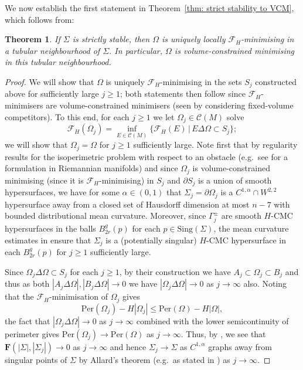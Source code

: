 \documentclass[12pt]{article}
\newtheorem{theorem}{Theorem}
\begin{document}
\medskip

We now establish the first statement in Theorem~\ref{thm: strict stability to VCM}, which follows from:

\begin{theorem}\label{thm: F_H strict stability to VCM} If $\Sigma$ is strictly stable, then $\Omega$ is uniquely locally $\mathcal{F}_H$-minimising in a tubular neighbourhood of $\Sigma$. In particular, $\Omega$ is volume-constrained minimising in this tubular neighbourhood.
\end{theorem} 

\begin{proof} 
    We will show that $\Omega$ is uniquely $\mathcal{F}_H$-minimising in the sets $S_j$ constructed above for sufficiently large $j \geq 1$; both statements then follow since $\mathcal{F}_H$-minimisers are volume-constrained minimisers (seen by considering fixed-volume competitors). To this end, for each $j \geq 1$ we let $\Omega_j \in \mathcal{C}(M)$ solve
    $$
        \mathcal{F}_H(\Omega_j) = \inf_{E \in \mathcal{C}(M)}\{\mathcal{F}_H(E) \, | \, E \Delta \Omega \subset S_j\};
    $$
    we will show that $\Omega_j = \Omega$ for $j \geq 1$ sufficiently large. Note first that by regularity results for the isoperimetric problem with respect to an obstacle (e.g.~see \cite[Theorem 1.1]{V10} for a formulation in Riemannian manifolds) and since $\Omega_j$ is volume-constrained minimising (since it is $\mathcal{F}_H$-minimising) in $S_j$ and $\partial S_j$ is a union of smooth hypersurfaces, we have for some $\alpha \in (0,1)$ that $\Sigma_j = \partial \Omega_j$ is a $C^{1,\alpha}\cap W^{2,2}$ hypersurface away from a closed set of Hausdorff dimension at most $n - 7$ with bounded distributional mean curvature. Moreover, since $\Gamma_j^{\pm}$ are smooth $H$-CMC hypersurfaces in the balls $B_{2r}^g(p)$ for each $p \in \mathrm{Sing}(\Sigma)$, the mean curvature estimates in \cite[Theorem 1.1]{V10} ensure that $\Sigma_j$ is a (potentially singular) $H$-CMC hypersurface in each $B_{2r}^g(p)$ for $j \geq 1$ sufficiently large.

    \bigskip

    Since $\Omega_j \Delta \Omega \subset S_j$ for each $j \geq 1$, by their construction we have $A_j \subset \Omega_j \subset B_j$ and thus as both $|A_j \Delta \Omega|, |B_j \Delta \Omega| \rightarrow 0$ we have $|\Omega_j \Delta \Omega| \rightarrow 0$ as $j \rightarrow \infty$ also. Noting that the $\mathcal{F}_H$-minimisation of $\Omega_j$ gives
    $$
            \mathrm{Per}(\Omega_j)-H|\Omega_j|
            \le
            \mathrm{Per}(\Omega)-H|\Omega|,
    $$
    the fact that $|\Omega_j \Delta \Omega| \rightarrow 0$ as $j \rightarrow \infty$ combined with the lower semicontinuity of perimeter gives $ \mathrm{Per}(\Omega_j)\rightarrow\mathrm{Per}(\Omega)$ as $j \rightarrow \infty$. Thus, by \cite[Proposition A.1]{DT13}, we see that $\mathbf{F}(|\Sigma|,|\Sigma_j|) \rightarrow 0$ as $j \rightarrow \infty$ and hence $\Sigma_j \rightarrow \Sigma$ as $C^{1,\alpha}$ graphs away from singular points of $\Sigma$ by Allard's theorem (e.g.~as stated in \cite[Chapter 5]{S83A}) as $j \rightarrow \infty$.


\end{proof}
\end{document}
